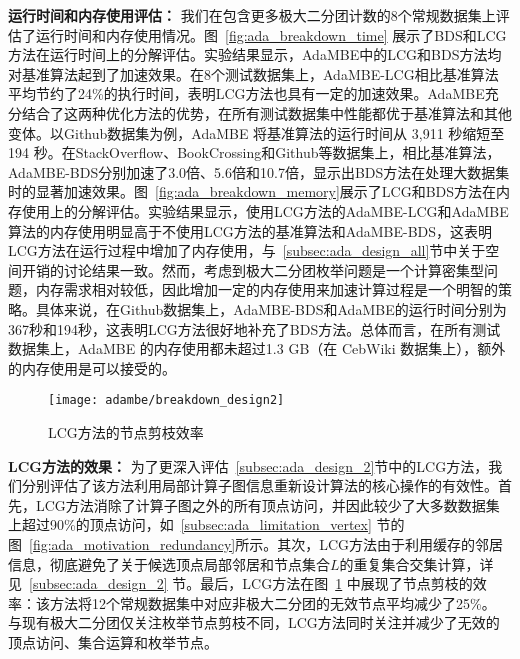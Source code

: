 \textbf{运行时间和内存使用评估：} 我们在包含更多极大二分团计数的8个常规数据集上评估了运行时间和内存使用情况。图~\ref{fig:ada_breakdown_time} 展示了BDS和LCG方法在运行时间上的分解评估。实验结果显示，AdaMBE中的LCG和BDS方法均对基准算法起到了加速效果。在8个测试数据集上，AdaMBE-LCG相比基准算法平均节约了24\%的执行时间，表明LCG方法也具有一定的加速效果。AdaMBE充分结合了这两种优化方法的优势，在所有测试数据集中性能都优于基准算法和其他变体。以Github数据集为例，AdaMBE 将基准算法的运行时间从 3,911 秒缩短至 194 秒。在StackOverflow、BookCrossing和Github等数据集上，相比基准算法，AdaMBE-BDS分别加速了3.0倍、5.6倍和10.7倍，显示出BDS方法在处理大数据集时的显著加速效果。图~\ref{fig:ada_breakdown_memory}展示了LCG和BDS方法在内存使用上的分解评估。实验结果显示，使用LCG方法的AdaMBE-LCG和AdaMBE算法的内存使用明显高于不使用LCG方法的基准算法和AdaMBE-BDS，这表明LCG方法在运行过程中增加了内存使用，与~\ref{subsec:ada_design_all}节中关于空间开销的讨论结果一致。然而，考虑到极大二分团枚举问题是一个计算密集型问题，内存需求相对较低，因此增加一定的内存使用来加速计算过程是一个明智的策略。具体来说，在Github数据集上，AdaMBE-BDS和AdaMBE的运行时间分别为367秒和194秒，这表明LCG方法很好地补充了BDS方法。总体而言，在所有测试数据集上，AdaMBE 的内存使用都未超过1.3 GB（在 CebWiki 数据集上），额外的内存使用是可以接受的。



\begin{figure} [t]
	\centering
	\texttt{[image: adambe/breakdown\_design2]}
	\caption{LCG方法的节点剪枝效率}
	\vspace{-0.1in}
	\label{fig:ada_breakdown_design2}
\end{figure}


\textbf{LCG方法的效果：} 为了更深入评估~\ref{subsec:ada_design_2}节中的LCG方法，我们分别评估了该方法利用局部计算子图信息重新设计算法的核心操作的有效性。首先，LCG方法消除了计算子图之外的所有顶点访问，并因此较少了大多数数据集上超过90\%的顶点访问，如~\ref{subsec:ada_limitation_vertex} 节的图~\ref{fig:ada_motivation_redundancy}所示。其次，LCG方法由于利用缓存的邻居信息，彻底避免了关于候选顶点局部邻居和节点集合$L$的重复集合交集计算，详见~\ref{subsec:ada_design_2} 节。最后，LCG方法在图~\ref{fig:ada_breakdown_design2} 中展现了节点剪枝的效率：该方法将12个常规数据集中对应非极大二分团的无效节点平均减少了25\%。
与现有极大二分团仅关注枚举节点剪枝不同，LCG方法同时关注并减少了无效的顶点访问、集合运算和枚举节点。

